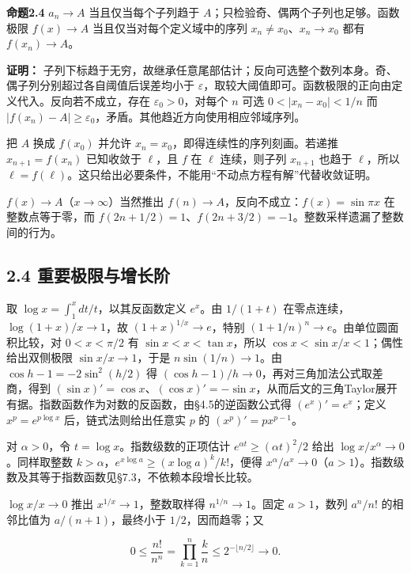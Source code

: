 \documentclass[11pt,a4paper]{article}
\begin{document}
\textbf{命题2.4} \(a_n\to A\) 当且仅当每个子列趋于
\(A\)；只检验奇、偶两个子列也足够。函数极限 \(f(x)\to A\)
当且仅当对每个定义域中的序列 \(x_n\ne x_0\)、\(x_n\to x_0\) 都有
\(f(x_n)\to A\)。

\textbf{证明：}
子列下标趋于无穷，故继承任意尾部估计；反向可选整个数列本身。奇、偶子列分别超过各自阈值后误差均小于
\(\varepsilon\)，取较大阈值即可。函数极限的正向由定义代入。反向若不成立，存在
\(\varepsilon_0>0\)，对每个 \(n\) 可选 \(0<|x_n-x_0|<1/n\) 而
\(|f(x_n)-A|\ge\varepsilon_0\)，矛盾。其他趋近方向使用相应邻域序列。

把 \(A\) 换成 \(f(x_0)\) 并允许
\(x_n=x_0\)，即得连续性的序列刻画。若递推 \(x_{n+1}=f(x_n)\) 已知收敛于
\(\ell\)，且 \(f\) 在 \(\ell\) 连续，则子列 \(x_{n+1}\) 也趋于
\(\ell\)，所以
\(\ell=f(\ell)\)。这只给出必要条件，不能用``不动点方程有解''代替收敛证明。

\(f(x)\to A\)（\(x\to\infty\)）当然推出
\(f(n)\to A\)，反向不成立：\(f(x)=\sin\pi x\) 在整数点等于零，而
\(f(2n+1/2)=1\)、\(f(2n+3/2)=-1\)。整数采样遗漏了整数间的行为。

\subsection{2.4
重要极限与增长阶}\label{ux91cdux8981ux6781ux9650ux4e0eux589eux957fux9636}

取 \(\log x=\int_1^xdt/t\)，以其反函数定义 \(e^x\)。由 \(1/(1+t)\)
在零点连续，\(\log(1+x)/x\to1\)，故 \((1+x)^{1/x}\to e\)，特别
\((1+1/n)^n\to e\)。由单位圆面积比较，对 \(0<x<\pi/2\) 有
\(\sin x<x<\tan x\)，所以 \(\cos x<\sin x/x<1\)；偶性给出双侧极限
\(\sin x/x\to1\)，于是 \(n\sin(1/n)\to1\)。由 \(\cos h-1=-2\sin^2(h/2)\)
得 \((\cos h-1)/h\to0\)，再对三角加法公式取差商，得到
\((\sin x)'=\cos x\)、\((\cos x)'=-\sin x\)，从而后文的三角Taylor展开有据。指数函数作为对数的反函数，由§4.5的逆函数公式得
\((e^x)'=e^x\)；定义 \(x^p=e^{p\log x}\) 后，链式法则给出任意实 \(p\) 的
\((x^p)'=px^{p-1}\)。

对 \(\alpha>0\)，令 \(t=\log x\)。指数级数的正项估计
\(e^{\alpha t}\ge(\alpha t)^2/2\) 给出
\(\log x/x^\alpha\to0\)。同样取整数
\(k>\alpha\)，\(e^{x\log a}\ge(x\log a)^k/k!\)，便得
\(x^\alpha/a^x\to0\)（\(a>1\)）。指数级数及其等于指数函数见§7.3，不依赖本段增长比较。

\(\log x/x\to0\) 推出 \(x^{1/x}\to1\)，整数取样得 \(n^{1/n}\to1\)。固定
\(a>1\)，数列 \(a^n/n!\) 的相邻比值为 \(a/(n+1)\)，最终小于
\(1/2\)，因而趋零；又

\[
0\le\frac{n!}{n^n}=\prod_{k=1}^n\frac{k}{n}
\le 2^{-\lfloor n/2\rfloor}\longrightarrow0.
\]
\end{document}
